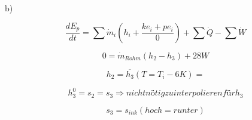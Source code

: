 b)

\[
\frac{dE_{p}}{dt} = \sum \dot{m}_i (h_i + \frac{ke_i + pe_i}{0}) + \sum \dot{Q} - \sum \dot{W}
\]

\[
0 = \dot{m}_{Rohm} (h_2 - h_3) + 28W
\]

\[
h_2 = \overline{h_3} (T = T_i - 6K) =
\]

\[
h_3^0 = s_2 = s_3 \Rightarrow nicht nötig zu interpolieren für h_3
\]

\[
s_3 = s_{ink} (hoch = runter)
\]